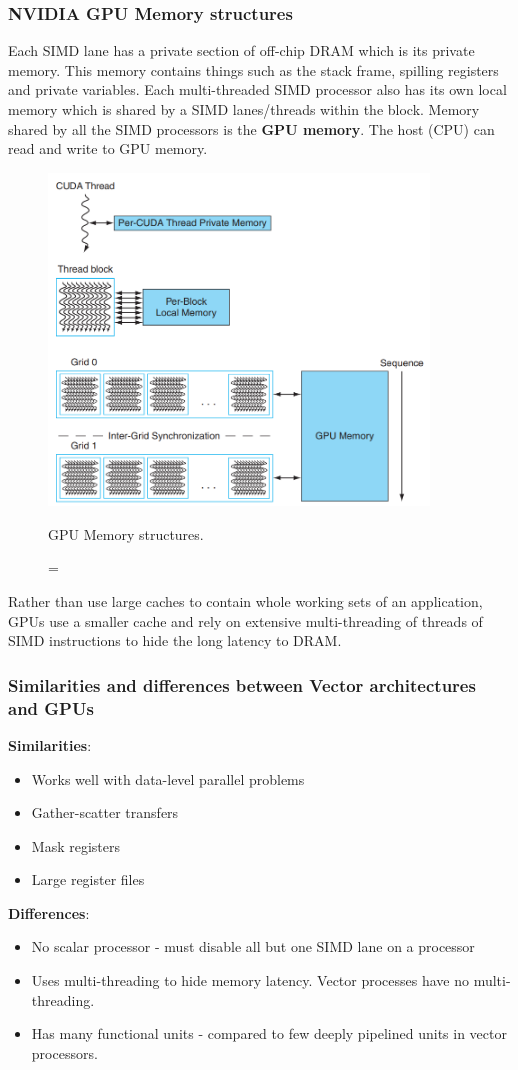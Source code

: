 \documentclass[11pt]{article}
\begin{document}
\subsubsection{NVIDIA GPU Memory structures}
Each SIMD lane has a private section of off-chip DRAM which is its private memory. This memory contains things such as the stack frame, spilling registers and private variables. 
\n
Each multi-threaded SIMD processor also has its own local memory which is shared by a SIMD lanes/threads within the block. 
\n
Memory shared by all the SIMD processors is the \textbf{GPU memory}. The host (CPU) can read and write to GPU memory. 

\begin{figure}[H]
\centering
\includegraphics[width=0.9\textwidth, keepaspectratio]{imgs/gpu-memory.png}
\caption={GPU Memory structures.}
\end{figure}
\noindent
Rather than use large caches to contain whole working sets of an application, GPUs use a smaller cache and rely on extensive multi-threading of threads of SIMD instructions to hide the long latency to DRAM. 
\subsubsection{Similarities and differences between Vector architectures and GPUs}
\textbf{Similarities}:
\begin{itemize}
\item Works well with data-level parallel problems
\item Gather-scatter transfers
\item Mask registers
\item Large register files
\end{itemize}
\textbf{Differences}:
\begin{itemize}
\item No scalar processor - must disable all but one SIMD lane on a processor 
\item Uses multi-threading to hide memory latency. Vector processes have no multi-threading. 
\item Has many functional units - compared to few deeply pipelined units in vector processors. 
\end{itemize}
\end{document}
